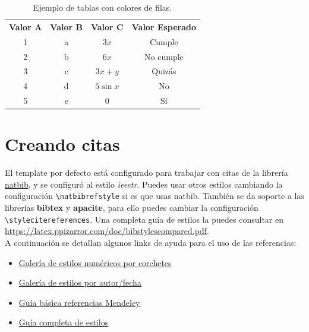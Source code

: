 \enabletablerowcolor
\begin{table}[H]
	\centering
	\caption{Ejemplo de tablas con colores de filas.}
	\begin{tabular}{ccccc}
		\rowcolor[rgb]{ .749,  .749,  .749} \textbf{Valor A} & \textbf{Valor B} & \textbf{Valor C} & \multicolumn{2}{c}{\textbf{Valor Esperado}} \\
		1     & a     & $3x$  & \multicolumn{2}{c}{Cumple} \\
		2     & b     & $6x$  & \multicolumn{2}{c}{No cumple} \\
		3     & c     & $3x+y$ & \multicolumn{2}{c}{Quizás} \\
		4     & d     & $5\sin x$ & \multicolumn{2}{c}{No} \\
		5     & e     & $0$ & \multicolumn{2}{c}{Sí} \\
	\end{tabular}
\end{table}
\disabletablerowcolor
	
\section{Creando citas}

El template por defecto está configurado para trabajar con citas de la librería \href{https://www.ctan.org/pkg/natbib}{natbib}, y se configuró al estilo \textit{ieeetr}. Puedes usar otros estilos cambiando la configuración \texttt{\textbackslash natbibrefstyle} si es que usas natbib. También se da soporte a las librerías \textbf{bibtex} y \textbf{apacite}, para ello puedes cambiar la configuración \texttt{\textbackslash stylecitereferences}. Una completa guía de estilos la puedes consultar en \url{https://latex.ppizarror.com/doc/bibstylescompared.pdf}. \\

A continuación se detallan algunos links de ayuda para el uso de las referencias:

\begin{itemize}
    \item \href{https://www.bibtex.com/bibliography-styles-numeric-square-brackets}{Galería de estilos numéricos por corchetes}
    \item \href{https://www.bibtex.com/bibliography-styles-author-date}{Galería de estilos por autor/fecha}
    \item \href{https://latex.ppizarror.com/res/guia_basica_referencias_mendeley_v3.pdf}{Guía básica referencias Mendeley}
    \item \href{https://latex.ppizarror.com/doc/bibstylescompared.pdf}{Guía completa de estilos}
\end{itemize}


